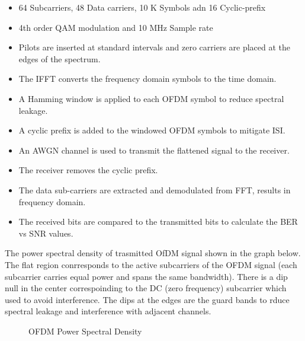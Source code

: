 \documentclass[conference]{IEEEtran}
\begin{document}
\begin{enumerate}
\begin{itemize}
\item 64 Subcarriers, 48 Data carriers, 10 K Symbols adn 16 Cyclic-prefix
\item 4th order QAM modulation and 10 MHz Sample rate
\item Pilots are inserted at standard intervals and zero carriers are placed at the edges of the spectrum.
\item The IFFT converts the frequency domain symbols to the time domain. 
\item A Hamming window is applied to each OFDM symbol to reduce spectral leakage. 
\item A cyclic prefix is added to the windowed OFDM symbols to mitigate ISI. 
\item An AWGN channel is used to transmit the flattened signal to the receiver.\par
\item The receiver removes the cyclic prefix. 
\item The data sub-carriers are extracted and demodulated from FFT, results in frequency domain. 
\item The received bits are compared to the transmitted bits to calculate the BER vs SNR values. 
\end{itemize}
The power spectral density of trasmitted OfDM signal shown in the graph below. The flat region conrresponds to the active subcarriers of the OFDM signal (each subcarrier carries equal power and spans the same bandwidth). There is a dip null in the center correspoinding to the DC (zero frequency) subcarrier which used to avoid interference. The dips at the edges are the guard bands to rduce spectral leakage and interference with adjacent channels.

	\begin{figure}[H]
    		\centering
    		\caption{OFDM Power Spectral Density}
	\end{figure}


\end{enumerate}
\end{document}
